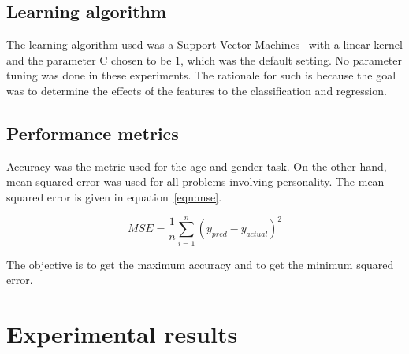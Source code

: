 \documentclass[a4paper]{llncs}
\begin{document}
\subsection{Learning algorithm}
The learning algorithm used was a Support Vector Machines~\cite{cortes1995support} with a linear kernel and the parameter C chosen to be 1, which was the default setting. No parameter tuning was done in these experiments. The rationale for such is because the goal was to determine the effects of the features to the classification and regression.  
\subsection{Performance metrics}
Accuracy was the metric used for the age and gender task. On the other hand, mean squared error was used for all problems involving personality. The mean squared error is given in equation~\ref{eqn:mse}.

\begin{equation}
MSE =\frac{1}{n} \sum_{i=1}^n \left( y_{pred}-y_{actual}\right)^2 
\label{eqn:mse}
\end{equation}


The objective is to get the maximum accuracy and to get the minimum squared error. 
\section{Experimental results}
\end{document}
